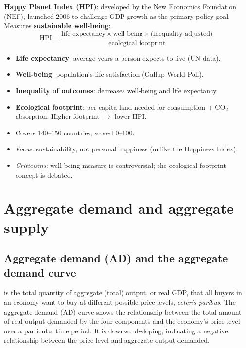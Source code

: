 \textbf{Happy Planet Index (HPI)}: developed by the New Economics Foundation (NEF), launched 2006 to challenge GDP growth as the primary policy goal. Measures \textbf{sustainable well-being}:
\[
\text{HPI} = \frac{\text{life expectancy} \times \text{well-being} \times \text{(inequality-adjusted)}}{\text{ecological footprint}}
\]
\begin{itemize}
  \item \textbf{Life expectancy}: average years a person expects to live (UN data).
  \item \textbf{Well-being}: population's life satisfaction (Gallup World Poll).
  \item \textbf{Inequality of outcomes}: decreases well-being and life expectancy.
  \item \textbf{Ecological footprint}: per-capita land needed for consumption + CO$_2$ absorption. Higher footprint $\to$ lower HPI.
  \item Covers 140--150 countries; scored 0--100.
  \item \textit{Focus}: sustainability, not personal happiness (unlike the Happiness Index).
  \item \textit{Criticisms}: well-being measure is controversial; the ecological footprint concept is debated.
\end{itemize}
\section{Aggregate demand and aggregate supply}
\subsection{Aggregate demand (AD) and the aggregate demand curve}
 is the total quantity of aggregate (total) output, or real GDP, that all buyers in an economy want to buy at different possible price levels, \emph{ceteris paribus}.
The aggregate demand (AD) curve shows the relationship between the total amount of real output demanded by the four components and the economy's price level over a particular time period. It is downward-sloping, indicating a negative relationship between the price level and aggregate output demanded.
